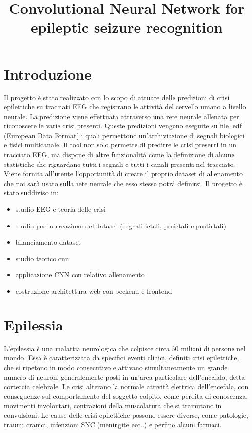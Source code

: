 \documentclass{article}
\begin{document}
\title{Convolutional Neural Network for epileptic seizure recognition}
\maketitle

\tableofcontents

\section*{Introduzione}
Il progetto è stato realizzato con lo scopo di attuare delle predizioni di crisi epilettiche su tracciati EEG che registrano le attività del  cervello umano a livello neurale.
La predizione viene effettuata attraverso una rete neurale allenata per riconoscere le varie crisi presenti.
Queste predizioni vengono eseguite su file .edf (European Data Format) i quali permettono un'archiviazione di segnali biologici e fisici multicanale.
Il tool non solo permette di predirre le crisi presenti in un tracciato EEG, ma dispone di altre funzionalità come la definizione di alcune statistiche che riguardano tutti i segnali e tutti i canali presenti nel tracciato.
Viene fornita all'utente l'opportunità di creare il proprio dataset di allenamento che poi sarà usato sulla rete neurale che esso stesso potrà definirsi. 
Il progetto è stato suddiviso in:
\begin{itemize}
\item studio EEG e teoria delle crisi
\item studio per la creazione del dataset (segnali ictali, preictali e postictali)
\item bilanciamento dataset
\item studio teorico cnn
\item applicazione CNN con relativo allenamento
\item costruzione architettura web con beckend e frontend 
\end{itemize}


\section{Epilessia}
L'epilessia è una malattia neurologica che colpisce circa 50 milioni di persone nel mondo. Essa è caratterizzata da specifici eventi clinici, definiti crisi epilettiche, che si ripetono in modo consecutivo e attivano simultaneamente un grande numero di neuroni generalemente posti in un'area particolare dell'encefalo, detta corteccia celebrale. Le crisi alterano la normale attività elettrica dell'encefalo, con conseguenze sul comportamento del soggetto colpito, come perdita di conoscenza, movimenti involontari, contrazioni della muscolatura che si tramutano in convulsioni.
Le cause delle crisi epilettiche possono essere diverse, come patologie, traumi cranici, infenzioni SNC (meningite ecc..) e perfino alcuni farmaci.
\end{document}
